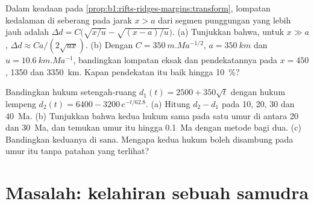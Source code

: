\begin{exercise}[$\star\star\star$]\label{exo:b1:rifts-ridges-margins:11}
Dalam keadaan pada \cref{prop:b1:rifts-ridges-margins:transform}, lompatan kedalaman
di seberang  pada jarak $x > a$ dari segmen punggungan yang lebih jauh
adalah $\Delta d = C\bigl(\sqrt{x/u} - \sqrt{(x - a)/u}\bigr)$. (a) Tunjukkan bahwa, untuk
$x \gg a$, $\Delta d \approx Ca/(2\sqrt{ux})$. (b) Dengan
$C = \qty{350}{m.Ma^{-1/2}}$, $a = \qty{350}{km}$ dan
$u = \qty{10.6}{km.Ma^{-1}}$, bandingkan lompatan eksak dan pendekatannya pada
$x = 450$, 1350 dan \qty{3350}{km}. Kapan pendekatan itu baik hingga \qty{10}{\percent}?
\end{exercise}

\begin{exercise}[$\star\star\star$]\label{exo:b1:rifts-ridges-margins:12}
Bandingkan hukum setengah-ruang $d_1(t) = 2500 + 350\sqrt t$ dengan hukum lempeng $d_2(t) = 6400 - 3200\,e^{-t/62.8}$. (a) Hitung $d_2 - d_1$ pada 10, 20, 30 dan \qty{40}{Ma}. (b) Tunjukkan bahwa kedua hukum sama pada satu umur di antara 20 dan \qty{30}{Ma}, dan temukan umur itu hingga \qty{0.1}{Ma} dengan metode bagi dua. (c) Bandingkan  keduanya di sana. Mengapa kedua hukum boleh disambung pada umur itu tanpa patahan yang terlihat?
\end{exercise}

\section{Masalah: kelahiran sebuah samudra}

